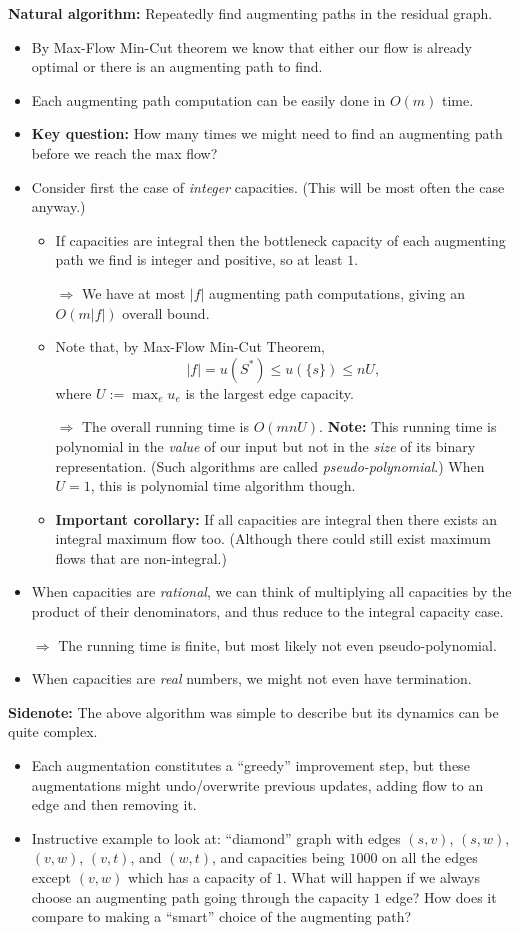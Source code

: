 \documentclass{article}
\begin{document}
\textbf{Natural algorithm:} Repeatedly find augmenting paths in the residual graph. 
\begin{itemize}
\item By Max-Flow Min-Cut theorem we know that either our flow is already optimal or there is an augmenting path to find.
\item Each augmenting path computation can be easily done in $O(m)$ time.
\item \textbf{Key question:} How many times we might need to find an augmenting path before we reach the max flow?
\item Consider first the case of {\em integer} capacities. (This will be most often the case anyway.)
\begin{itemize}
\item If capacities are integral then the bottleneck capacity of each augmenting path we find is integer and positive, so at least $1$.

$\Rightarrow$ We have at most $|f|$ augmenting path computations, giving an $O(m|f|)$ overall bound. 

\item Note that, by Max-Flow Min-Cut Theorem, 
\[
|f|=u(S^*)\leq u(\{s\})\leq nU,
\]
where $U:=\max_e u_e$ is the largest edge capacity. 

$\Rightarrow$ The overall running time is $O(mnU)$. \textbf{Note:} This running time is polynomial in the {\em value} of our input but not in the {\em size} of its binary representation. (Such algorithms are called {\em pseudo-polynomial}.) When $U=1$, this is polynomial time algorithm though. 
\item \textbf{Important corollary:} If all capacities are integral then there exists an integral maximum flow too. (Although there could still exist maximum flows that are non-integral.)
\end{itemize}
\item When capacities are {\em rational}, we can think of multiplying all capacities by the product of their denominators, and thus reduce to the integral capacity case.

$\Rightarrow$ The running time is finite, but most likely not even pseudo-polynomial. 
\item When capacities are {\em real} numbers, we might not even have termination.
\end{itemize}

\textbf{Sidenote:} The above algorithm was simple to describe but its dynamics can be quite complex.
\begin{itemize}
\item Each augmentation constitutes a ``greedy'' improvement step, but these augmentations might undo/overwrite previous updates, adding flow to an edge and then removing it. 
\item Instructive example to look at: ``diamond'' graph with edges $(s, v)$, $(s,w)$, $(v,w)$, $(v,t)$, and $(w,t)$, and capacities being $1000$ on all the edges except $(v,w)$ which has a capacity of $1$. What will happen if we always choose an augmenting path going through the capacity $1$ edge? How does it compare to making a ``smart'' choice of the augmenting path?
\end{itemize}
\end{document}
